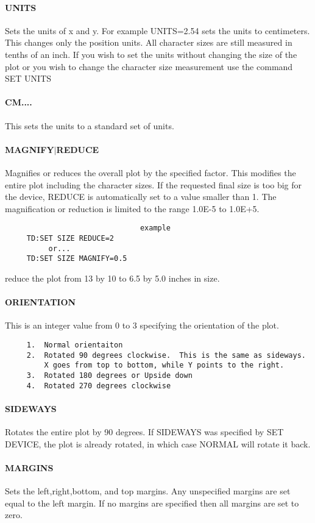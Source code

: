 \paragraph{UNITS}
Sets  the units of x and y.  For example UNITS=2.54 sets the units to
centimeters.  This changes only the position  units.   All  character
sizes  are  still  measured in tenths of an inch.  If you wish to set
the units without changing the size of the plot or you wish to change
the character size measurement use the command SET UNITS 
\paragraph{CM....}
This sets the units to a standard set of units.  
\paragraph{MAGNIFY$|$REDUCE}
Magnifies  or reduces the overall plot by the specified factor.  This
modifies the entire plot  including  the  character  sizes.   If  the
requested   final   size  is  too  big  for  the  device,  REDUCE  is
automatically set to a value smaller than 1.   The  magnification  or
reduction is limited to the range 1.0E-5 to 1.0E+5.  

\begin{verbatim}
                               example
     TD:SET SIZE REDUCE=2 
          or...  
     TD:SET SIZE MAGNIFY=0.5 
\end{verbatim}
reduce the plot from 13 by 10 to 6.5 by 5.0 inches in size.  
\paragraph{ORIENTATION}
This  is  an  integer value from 0 to 3 specifying the orientation of
the plot.  
\begin{verbatim}
     1.  Normal orientaiton 
     2.  Rotated 90 degrees clockwise.  This is the same as sideways.
         X goes from top to bottom, while Y points to the right.  
     3.  Rotated 180 degrees or Upside down 
     4.  Rotated 270 degrees clockwise 
\end{verbatim}
\paragraph{SIDEWAYS}
Rotates  the entire plot by 90 degrees.  If SIDEWAYS was specified by
SET DEVICE, the plot is already rotated, in which  case  NORMAL  will
rotate it back.  
\paragraph{MARGINS}
Sets the left,right,bottom, and top margins.  Any unspecified margins
are set equal to the left margin.  If no margins are  specified  then
all margins are set to zero.  
